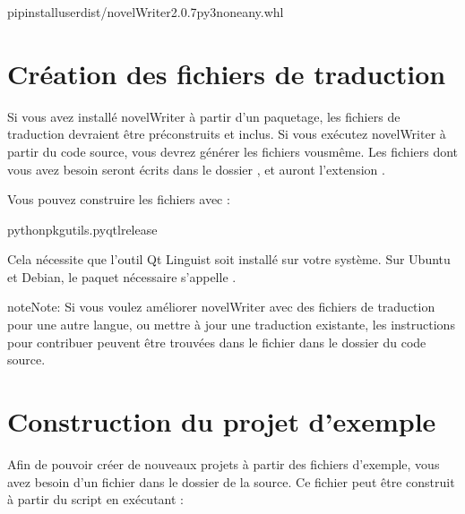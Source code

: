 \documentclass[a4paper,11pt,french]{sphinxmanual}
\begin{document}
\begin{sphinxVerbatim}[commandchars=\\\{\}]
pipinstall\PYGZhy{}\PYGZhy{}userdist/novelWriter\PYGZhy{}2.0.7\PYGZhy{}py3\PYGZhy{}none\PYGZhy{}any.whl
\end{sphinxVerbatim}


\section{Création des fichiers de traduction}
\label{\detokenize{tech_source:building-the-translation-files}}\label{\detokenize{tech_source:a-source-i18n}}
\sphinxAtStartPar
Si vous avez installé novelWriter à partir d’un paquetage, les fichiers de traduction devraient être préconstruits et inclus. Si vous exécutez novelWriter à partir du code source, vous devrez générer les fichiers vous\sphinxhyphen{}même. Les fichiers dont vous avez besoin seront écrits dans le dossier , et auront l’extension .

\sphinxAtStartPar
Vous pouvez construire les fichiers  avec :

\begin{sphinxVerbatim}[commandchars=\\\{\}]
pythonpkgutils.pyqtlrelease
\end{sphinxVerbatim}

\sphinxAtStartPar
Cela nécessite que l’outil Qt Linguist soit installé sur votre système. Sur Ubuntu et Debian, le paquet nécessaire s’appelle .

\begin{sphinxadmonition}{note}{Note:}
\sphinxAtStartPar
Si vous voulez améliorer novelWriter avec des fichiers de traduction pour une autre langue, ou mettre à jour une traduction existante, les instructions pour contribuer peuvent être trouvées dans le fichier  dans le dossier  du code source.
\end{sphinxadmonition}


\section{Construction du projet d’exemple}
\label{\detokenize{tech_source:building-the-example-project}}\label{\detokenize{tech_source:a-source-sample}}
\sphinxAtStartPar
Afin de pouvoir créer de nouveaux projets à partir des fichiers d’exemple, vous avez besoin d’un fichier  dans le dossier  de la source. Ce fichier peut être construit à partir du script  en exécutant :
\end{document}
